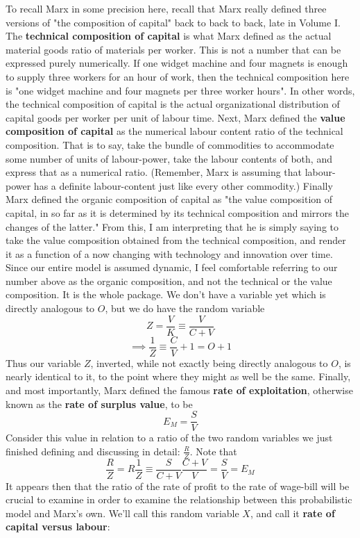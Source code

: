 To recall Marx in some precision here, recall that Marx really defined three versions of "the composition of capital" back to back to back, late in Volume I. The \textbf{technical composition of capital} is what Marx defined as the actual material goods ratio of materials per worker. This is not a number that can be expressed purely numerically. If one widget machine and four magnets is enough to supply three workers for an hour of work, then the technical composition here is "one widget machine and four magnets per three worker hours". In other words, the technical composition of capital is the actual organizational distribution of capital goods per worker per unit of labour time. Next, Marx defined the \textbf{value composition of capital} as the numerical labour content ratio of the technical composition. That is to say, take the bundle of commodities to accommodate some number of units of labour-power, take the labour contents of both, and express that as a numerical ratio. (Remember, Marx is assuming that labour-power has a definite labour-content just like every other commodity.) Finally Marx defined the organic composition of capital as "the value composition of capital, in so far as it is determined by its technical composition and mirrors the changes of the latter." From this, I am interpreting that he is simply saying to take the value composition obtained from the technical composition, and render it as a function of a now changing with technology and innovation over time. Since our entire model is assumed dynamic, I feel comfortable referring to our number above as the organic composition, and not the technical or the value composition. It is the whole package. We don't have a variable yet which is directly analogous to $O$, but we do have the random variable 
\[ Z = \frac{V}{K} \equiv \frac{V}{C+V} \]
\[ \implies \frac{1}{Z} \equiv \frac{C}{V}+1 = O+1 \]
Thus our variable $Z$, inverted, while not exactly being directly analogous to $O$, is nearly identical to it, to the point where they might as well be the same. Finally, and most importantly, Marx defined the famous \textbf{rate of exploitation}, otherwise known as the \textbf{rate of surplus value}, to be
\[ E_M = \frac{S}{V} \]
Consider this value in relation to a ratio of the two random variables we just finished defining and discussing in detail: $\frac{R}{Z}$. Note that
\[ \frac{R}{Z} = R\frac{1}{Z} \equiv \frac{S}{C+V}\frac{C+V}{V} = \frac{S}{V} = E_M \]
It appears then that the ratio of the rate of profit to the rate of wage-bill will be crucial to examine in order to examine the relationship between this probabilistic model and Marx's own. We'll call this random variable $X$, and call it \textbf{rate of capital versus labour}:
